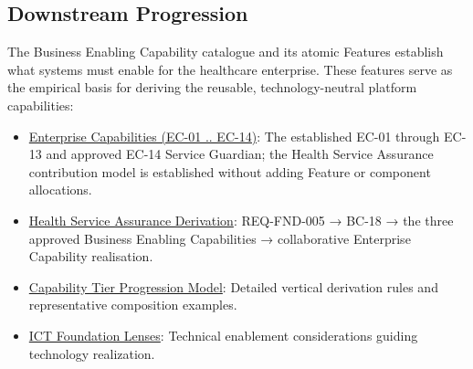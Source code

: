 \label{rad:enabling:775}

\par\smallskip
{}\label{rad:enabling:777}
\subsection*{Downstream Progression}
\label{rad:enabling:779}

The Business Enabling Capability catalogue and its atomic Features establish what systems must enable for the healthcare enterprise. These features serve as the empirical basis for deriving the reusable, technology-neutral platform capabilities:

\label{rad:enabling:780}

\begin{itemize}

\item
\hyperref[rad:enterprise]{Enterprise Capabilities (EC-01 .. EC-14)}: The established EC-01 through EC-13 and approved EC-14 Service Guardian; the Health Service Assurance contribution model is established without adding Feature or component allocations.



\item
\hyperref[rad:assurance-strategy]{Health Service Assurance Derivation}: REQ-FND-005 → BC-18 → the three approved Business Enabling Capabilities → collaborative Enterprise Capability realisation.



\item
\hyperref[rad:tier-model]{Capability Tier Progression Model}: Detailed vertical derivation rules and representative composition examples.



\item
\href{https://github.com/fhirfactory/harmonia/blob/98410db60155198a75f74c79d98060070209faa1/docs/markdown/02-strategy/capabilities/ict-foundation-lenses.md}{ICT Foundation Lenses}: Technical enablement considerations guiding technology realization.



\end{itemize}
